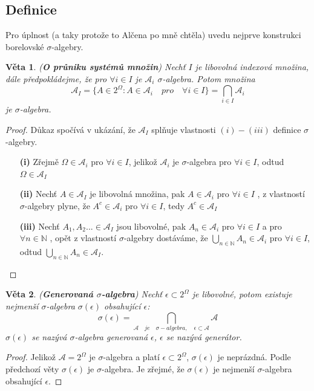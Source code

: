 \documentclass[a4]{report}
\newtheorem{theorem}{Věta}
\theoremstyle{definition}
\begin{document}
{\subsection{Definice}
Pro úplnost (a taky protože to Alčena po mně chtěla) uvedu nejprve konstrukci borelovské $\sigma$-algebry.
\begin{theorem}{(\textbf{O průniku systémů množin})}
Nechť $I$ je libovolná indexová množina, dále předpokládejme, že pro $\forall i \in I$ je $\mathcal{A}_{i}$ $\sigma$-algebra. Potom množina $$\mathcal{A}_{I} = \lbrace A \in 2^{\Omega} : A \in \mathcal{A}_{i} \quad pro \quad \forall i \in I \rbrace = \bigcap_{i \in I} \mathcal{A}_{i}$$ je $\sigma$-algebra. 
\end{theorem}
\begin{proof}
Důkaz spočívá v ukázání, že $\mathcal{A}_{I}$ splňuje vlastnosti $(i) - (iii)$ definice $\sigma$-algebry.
\begin{itemize}
\item[\textbf{(i)}] Zřejmě $\Omega \in \mathcal{A}_{i}$ pro $\forall i \in I$, jelikož $\mathcal{A}_{i}$ je $\sigma$-algebra pro $\forall i \in I$, odtud $\Omega \in \mathcal{A}_{I}$
\item[\textbf{(ii)}] Nechť $A\in \mathcal{A}_{I}$ je libovolná množina, pak $A\in \mathcal{A}_{i}$ pro $\forall i \in I$ , z vlastností $\sigma$-algebry plyne, že $A^{c}\in \mathcal{A}_{i}$ pro $\forall i \in I$, tedy $A^{c}\in \mathcal{A}_{I}$
\item[\textbf{(iii)}] Nechť $A_{1},A_{2}...\in \mathcal{A}_{I}$ jsou libovolné, pak $A_{n}\in \mathcal{A}_{i}$ pro $\forall i \in I$ a pro $\forall n \in \mathbb{N}$ , opět z vlastností $\sigma$-algebry dostáváme, že $ \bigcup_{n \in \mathbb{N}}A_{n} \in \mathcal{A}_{i} $ pro $\forall i \in I$, odtud $\bigcup_{n \in \mathbb{N}}A_{n} \in \mathcal{A}_{I}$.
\end{itemize}
\end{proof}
\begin{theorem}{(\textbf{Generovaná $\sigma$-algebra})}
Nechť $\epsilon \subset 2^{\Omega}$ je libovolné, potom existuje nejmenší $\sigma$-algebra $\sigma(\epsilon)$ obsahující $\epsilon$: $$\sigma(\epsilon) = \bigcap_{\mathcal{A} \quad je \quad \sigma-algebra, \quad \epsilon \subset \mathcal{A}}\mathcal{A}$$ 
$\sigma(\epsilon)$ se nazývá $\sigma$-algebra generovaná $\epsilon$, $\epsilon$ se nazývá generátor.
\end{theorem}
\begin{proof}
Jelikož $\mathcal{A} = 2^{\Omega}$ je $\sigma$-algebra a platí $\epsilon \subset 2^{\Omega}$, $\sigma(\epsilon)$ je neprázdná. Podle předchozí věty $\sigma(\epsilon)$ je $\sigma$-algebra. Je zřejmé, že $\sigma(\epsilon)$ je nejmenší $\sigma$-algebra obsahující $\epsilon$.
\end{proof}


}
\end{document}

